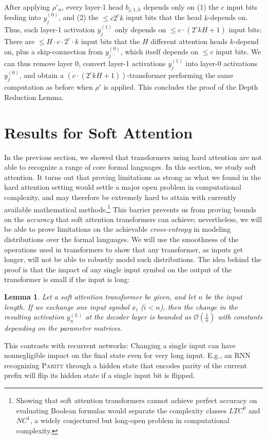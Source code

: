 \documentclass[11pt,a4paper]{article}
\newcounter{theorem}
\newtheorem{lemma}[theorem]{Lemma}
\begin{document}
After applying $\rho'_n$, every layer-1 head $b_{j,1,h}$ depends only on (1) the $c$ input bits feeding into $y_j^{(0)}$, and (2) the $\leq c2^ck$ input bits that the head $k$-depends on.
Thus, each layer-1 activation $y_j^{(1)}$ only depends on $\leq c\cdot (2^ckH+1)$ input bits: There are $\leq H\cdot c \cdot 2^c \cdot k$ input bits that the $H$ different attention heads $k$-depend on, plus a skip-connection from $y_j^{(0)}$, which itself depends on $\leq c$ input bits.
We can thus remove layer 0, convert layer-1 activations $y_j^{(1)}$ into layer-0 activations $y_j^{(0)}$, and obtain a $(c\cdot(2^ckH+1))$-transformer performing the same computation as before when $\rho'$ is applied.
This concludes the proof of the Depth Reduction Lemma.






\section{Results for Soft Attention}\label{sec:soft}

In the previous section, we showed that transformers using hard attention are not able to recognize a range of core formal languages.
In this section, we study soft attention.
It turns out that proving limitations as strong as what we found in the hard attention setting would settle a major open problem in computational complexity, and  may therefore be extremely hard to attain with currently available mathematical methods.\footnote{Showing that soft attention transformers cannot achieve perfect accuracy on evaluating Boolean formulas would separate the complexity classes $LTC^0$ and $NC^1$, a widely conjectured but long-open problem in computational complexity.}
This barrier prevents us from proving bounds on the \emph{accuracy} that soft attention transformers can achieve; nevertheless, we will be able to prove limitations on the achievable \emph{cross-entropy} in modeling distributions over the formal languages.
We will use the smoothness of the operations used in transformers to show that any transformer, as inputs get longer, will not be able to robustly model such distributions.
The idea behind the proof is that the impact of any single input symbol on the output of the transformer is small if the input is long:
\begin{lemma}\label{lem:soft-tech}
Let a soft attention transformer be given, and let $n$ be the input length.
If we exchange one input symbol $x_i$ ($i < n$), %
then the change in the resulting activation $y_n^{(L)}$ at the decoder layer is bounded as $\mathcal{O}(\frac{1}{n})$ with constants depending on the parameter matrices.
\end{lemma}
This contrasts with recurrent networks:
Changing a single input can have nonnegligible impact on the final state even for very long input.
E.g., an RNN recognizing \textsc{Parity} through a hidden state that encodes parity of the current prefix will flip its hidden state if a single input bit is flipped.
\end{document}

